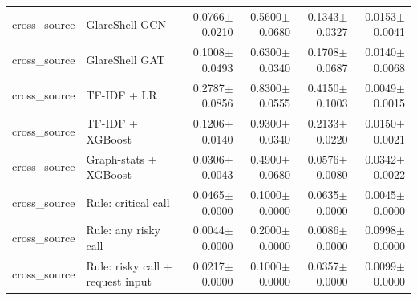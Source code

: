 \begin{tabular}{@{}llrrrr@{}}
cross\_source & GlareShell GCN & 0.0766$\pm$0.0210 & 0.5600$\pm$0.0680 & 0.1343$\pm$0.0327 & 0.0153$\pm$0.0041 \\
cross\_source & GlareShell GAT & 0.1008$\pm$0.0493 & 0.6300$\pm$0.0340 & 0.1708$\pm$0.0687 & 0.0140$\pm$0.0068 \\
cross\_source & TF-IDF + LR & 0.2787$\pm$0.0856 & 0.8300$\pm$0.0555 & 0.4150$\pm$0.1003 & 0.0049$\pm$0.0015 \\
cross\_source & TF-IDF + XGBoost & 0.1206$\pm$0.0140 & 0.9300$\pm$0.0340 & 0.2133$\pm$0.0220 & 0.0150$\pm$0.0021 \\
cross\_source & Graph-stats + XGBoost & 0.0306$\pm$0.0043 & 0.4900$\pm$0.0680 & 0.0576$\pm$0.0080 & 0.0342$\pm$0.0022 \\
cross\_source & Rule: critical call & 0.0465$\pm$0.0000 & 0.1000$\pm$0.0000 & 0.0635$\pm$0.0000 & 0.0045$\pm$0.0000 \\
cross\_source & Rule: any risky call & 0.0044$\pm$0.0000 & 0.2000$\pm$0.0000 & 0.0086$\pm$0.0000 & 0.0998$\pm$0.0000 \\
cross\_source & Rule: risky call + request input & 0.0217$\pm$0.0000 & 0.1000$\pm$0.0000 & 0.0357$\pm$0.0000 & 0.0099$\pm$0.0000 \\
\bottomrule
\end{tabular}

